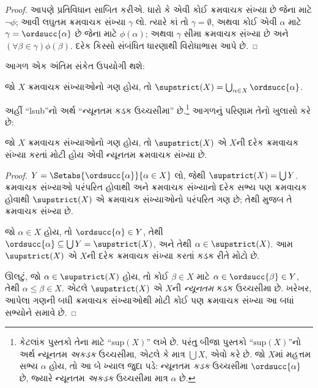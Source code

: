 \documentclass[../../../include/open-logic-section]{subfiles}
\begin{document}
\begin{proof}
આપણે પ્રતિવિધાન સાબિત કરીએ. ધારો કે એવી કોઈ ક્રમવાચક સંખ્યા છે
જેના માટે $\lnot\phi$; આવી લઘુતમ ક્રમવાચક સંખ્યા $\gamma$ લો.
ત્યારે કાં તો $\gamma = \emptyset$, અથવા કોઈ એવી $\alpha$ માટે
$\gamma = \ordsucc{\alpha}$ છે જેના માટે $\phi(\alpha)$;
અથવા $\gamma$ સીમા ક્રમવાચક સંખ્યા છે અને $(\forall
\beta \in \gamma)\phi(\beta)$. દરેક કિસ્સો સંબંધિત ધારણાથી
વિરોધાભાસ આપે છે.
\end{proof}
\noindent
આગળ એક અંતિમ સંકેત ઉપયોગી થશે:

\begin{defn}
જો $X$ ક્રમવાચક સંખ્યાઓનો ગણ હોય, તો $\supstrict(X) = \bigcup_{\alpha
\in X} \ordsucc{\alpha}$.
\end{defn}
\noindent
અહીં ``lsub''નો અર્થ ``ન્યૂનતમ કડક ઉચ્ચસીમા'' છે.\footnote{કેટલાંક
પુસ્તકો તેના માટે ``$\text{sup}(X)$'' લખે છે. પરંતુ બીજા પુસ્તકો
``$\text{sup}(X)$''નો અર્થ ન્યૂનતમ \emph{અકડક} ઉચ્ચસીમા,
એટલે કે માત્ર $\bigcup X$, એવો કરે છે. જો $X$માં મહત્તમ સભ્ય
$\alpha$ હોય, તો આ બે ખ્યાલ જુદા પડે: ન્યૂનતમ \emph{કડક}
ઉચ્ચસીમા $\ordsucc{\alpha}$ છે, જ્યારે ન્યૂનતમ \emph{અકડક}
ઉચ્ચસીમા માત્ર $\alpha$ છે.} આગળનું પરિણામ તેનો ખુલાસો કરે છે:

\begin{prop}
જો $X$ ક્રમવાચક સંખ્યાઓનો ગણ હોય, તો $\supstrict(X)$ એ $X$ની
દરેક ક્રમવાચક સંખ્યા કરતાં મોટી હોય એવી ન્યૂનતમ ક્રમવાચક સંખ્યા છે.
\end{prop}

\begin{proof}
$Y = \Setabs{\ordsucc{\alpha}}{\alpha \in X}$ લો, જેથી
$\supstrict(X) = \bigcup Y$. ક્રમવાચક સંખ્યાઓ પરંપરિત હોવાથી અને
ક્રમવાચક સંખ્યાનો દરેક સભ્ય પણ ક્રમવાચક હોવાથી $\supstrict(X)$
એ ક્રમવાચક સંખ્યાઓનો પરંપરિત ગણ છે; તેથી
 મુજબ તે ક્રમવાચક સંખ્યા છે.

જો $\alpha \in X$ હોય, તો $\ordsucc{\alpha} \in Y$, તેથી $\ordsucc{\alpha}
\subseteq \bigcup Y = \supstrict(X)$, અને તેથી $\alpha \in
\supstrict(X)$. આમ $\supstrict(X)$ એ $X$ની દરેક ક્રમવાચક
સંખ્યા કરતાં કડક રીતે મોટો છે.

ઊલટું, જો $\alpha \in \supstrict(X)$ હોય, તો કોઈ $\beta \in X$
માટે $\alpha \in
\ordsucc{\beta} \in Y$, તેથી $\alpha \leq
\beta \in X$. એટલે $\supstrict(X)$ એ $X$ની \emph{ન્યૂનતમ}
કડક ઉચ્ચસીમા છે. ખરેખર, આપેલા ગણની બધી ક્રમવાચક સંખ્યાઓથી
મોટી કોઈ પણ ક્રમવાચક સંખ્યા આ બધાં સભ્યોને સમાવે છે.
\end{proof}
\end{document}
